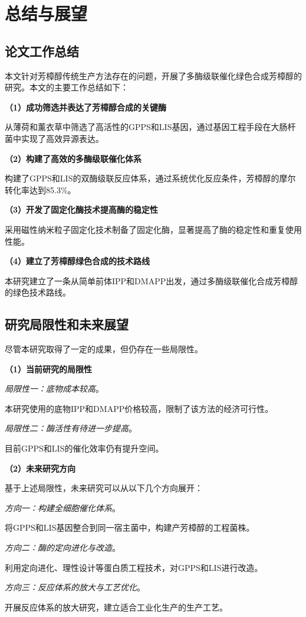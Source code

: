 \section{总结与展望}

\subsection{论文工作总结}


本文针对芳樟醇传统生产方法存在的问题，开展了多酶级联催化绿色合成芳樟醇的研究。本文的主要工作总结如下：

\textbf{（1）成功筛选并表达了芳樟醇合成的关键酶}


从薄荷和薰衣草中筛选了高活性的GPPS和LIS基因，通过基因工程手段在大肠杆菌中实现了高效异源表达。

\textbf{（2）构建了高效的多酶级联催化体系}


构建了GPPS和LIS的双酶级联反应体系，通过系统优化反应条件，芳樟醇的摩尔转化率达到85.3\%。

\textbf{（3）开发了固定化酶技术提高酶的稳定性}


采用磁性纳米粒子固定化技术制备了固定化酶，显著提高了酶的稳定性和重复使用性能。

\textbf{（4）建立了芳樟醇绿色合成的技术路线}


本研究建立了一条从简单前体IPP和DMAPP出发，通过多酶级联催化合成芳樟醇的绿色技术路线。

\subsection{研究局限性和未来展望}


尽管本研究取得了一定的成果，但仍存在一些局限性。

\textbf{（1）当前研究的局限性}

\textit{局限性一：底物成本较高}。


本研究使用的底物IPP和DMAPP价格较高，限制了该方法的经济可行性。

\textit{局限性二：酶活性有待进一步提高}。


目前GPPS和LIS的催化效率仍有提升空间。

\textbf{（2）未来研究方向}

基于上述局限性，未来研究可以从以下几个方向展开：

\textit{方向一：构建全细胞催化体系}。


将GPPS和LIS基因整合到同一宿主菌中，构建产芳樟醇的工程菌株。

\textit{方向二：酶的定向进化与改造}。


利用定向进化、理性设计等蛋白质工程技术，对GPPS和LIS进行改造。

\textit{方向三：反应体系的放大与工艺优化}。


开展反应体系的放大研究，建立适合工业化生产的生产工艺。
